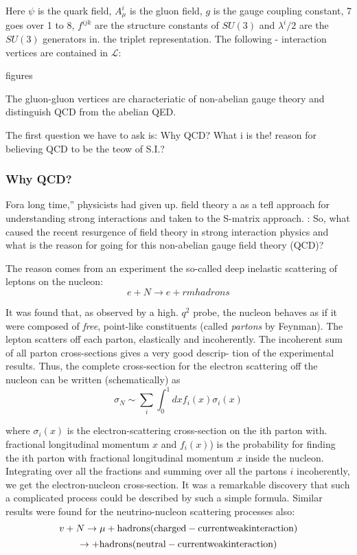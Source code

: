 Here $\psi$ is the quark field, $A_{\mu}^{i}$ is the gluon field, $g$ is the gauge coupling
constant, 7 goes over 1 to 8, $f^{ijk}$ are the structure constants of $SU (3)$ and
$\lambda^{i}/2$ are the $SU(3)$ generators in. the triplet representation. The following -
interaction vertices are contained in $\mathcal{L}$:

figures

The gluon-gluon vertices are characteriatic of non-abelian gauge theory
and distinguish QCD from the abelian QED.  

The first question we have to ask is: Why QCD? What i is the! reason
for believing QCD to be the teow of S.I.?

\subsubsection*{Why QCD?}

Fora long time,” physicists had given up. field theory a as a tefl approach for understanding strong interactions and taken to the S-matrix approach. : So, what caused the recent resurgence of field theory in strong interaction physics and what is the reason for going for this non-abelian gauge field theory (QCD)? 

The reason comes from an experiment the so-called deep inelastic scattering of leptons on the nucleon: 
$$
e + N \rightarrow e + {rm hadrons}
$$

It was found that, as observed by a high. $q^{2}$ probe, the nucleon behaves as if it were composed of {\it free}, point-like constituents (called {\it partons} by Feynman). The lepton scatters off each parton, elastically and incoherently. The incoherent sum of all parton cross-sections gives a very good descrip- tion of the experimental results. Thus, the complete cross-section for the electron scattering off the nucleon can be written (schematically) as 
$$
\sigma_{N} \sim \sum_{i} \int^{1}_{0} dx f_{i}(x) \sigma_{i}(x)
$$

where $\sigma_{i}(x)$ is the electron-scattering cross-section on the ith parton with. fractional longitudinal momentum $x$ and $f_{i}(x)$) is the probability for finding the ith parton with fractional longitudinal momentum $x$ inside the nucleon. Integrating over all the fractions and summing over all the partons $i$ incoherently, we get the electron-nucleon cross-section. It was a remarkable discovery that such a complicated process could be described by such a simple formula. Similar results were found for the neutrino-nucleon scattering processes also:
$$
v + N \rightarrow \mu + {\rm hadrons(charged- current weak interaction)} 
$$ 
$$
\rightarrow + {\rm hadrons (neutral-current weak interaction)}
$$

